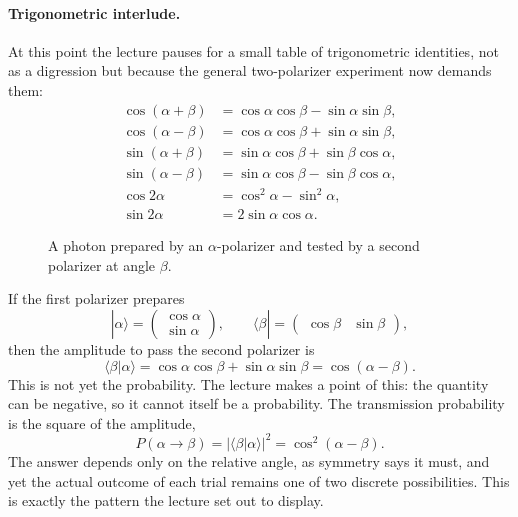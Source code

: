 \paragraph{Trigonometric interlude.}
At this point the lecture pauses for a small table of trigonometric identities, not as a digression but because the general two-polarizer experiment now demands them:
\begin{align}
\cos(\alpha+\beta)&=\cos\alpha\cos\beta-\sin\alpha\sin\beta,\\
\cos(\alpha-\beta)&=\cos\alpha\cos\beta+\sin\alpha\sin\beta,\\
\sin(\alpha+\beta)&=\sin\alpha\cos\beta+\sin\beta\cos\alpha,\\
\sin(\alpha-\beta)&=\sin\alpha\cos\beta-\sin\beta\cos\alpha,\\
\cos 2\alpha&=\cos^2\alpha-\sin^2\alpha,\\
\sin 2\alpha&=2\sin\alpha\cos\alpha.
\end{align}

\begin{figure}
\centering
{}
\caption{A photon prepared by an \(\alpha\)-polarizer and tested by a second polarizer at angle \(\beta\).}
\end{figure}

If the first polarizer prepares
\begin{equation}
|\alpha\rangle=
\begin{pmatrix}
\cos\alpha\\
\sin\alpha
\end{pmatrix},
\qquad
\langle \beta|=
\begin{pmatrix}
\cos\beta&\sin\beta
\end{pmatrix},
\end{equation}
then the amplitude to pass the second polarizer is
\begin{equation}
\langle\beta|\alpha\rangle
=
\cos\alpha\cos\beta+\sin\alpha\sin\beta
=
\cos(\alpha-\beta).
\end{equation}
This is not yet the probability. The lecture makes a point of this: the quantity can be negative, so it cannot itself be a probability. The transmission probability is the square of the amplitude,
\begin{equation}
P(\alpha\to\beta)=|\langle\beta|\alpha\rangle|^2=\cos^2(\alpha-\beta).
\end{equation}
The answer depends only on the relative angle, as symmetry says it must, and yet the actual outcome of each trial remains one of two discrete possibilities. This is exactly the pattern the lecture set out to display.


